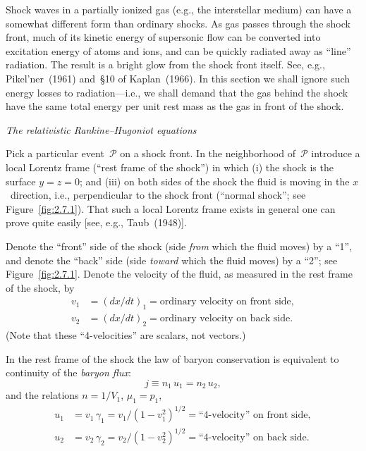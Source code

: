 Shock waves in a partially ionized gas (e.g., the interstellar medium) can have
a somewhat different form than ordinary shocks.  As gas passes through the shock
front, much of its kinetic energy of supersonic flow can be converted into
excitation energy of atoms and ions, and can be quickly radiated away as ``line''
radiation.  The result is a bright glow from the shock front itself.  See, e.g.,
Pikel'ner~(1961) and~\S10 of Kaplan~(1966).  In this section we shall ignore such
energy losses to radiation---i.e., we shall demand that the gas behind the shock
have the same total energy per unit rest mass as the gas in front of the shock.


\bigskip
\noindent
\emph{The relativistic Rankine--Hugoniot equations}

\medskip
\noindent
Pick a particular event~$\mathscr{P}$ on a shock front.  In the neighborhood
of~$\mathscr{P}$ introduce a local Lorentz frame (``rest frame of the shock'')
in which (i) the shock is the surface $y = z = 0$; and (iii) on both sides of
the shock the fluid is moving in the $x$~direction, i.e., perpendicular to the
shock front (``normal shock''; see Figure~\ref{fig:2.7.1}).  That such a local
Lorentz frame exists in general one can prove quite easily [see, e.g.,
Taub~(1948)].

Denote the ``front'' side of the shock (side \emph{from} which the fluid moves)
by a ``1'', and denote the ``back'' side (side \emph{toward} which the fluid
moves) by a ``2''; see Figure~\ref{fig:2.7.1}.  Denote the velocity of the
fluid, as measured in the rest frame of the shock, by
%
\begin{subequations}
\begin{align}
\tag{2.7.1a}
v_1 &= (dx/dt)_1 = \text{ordinary velocity on front side},\\[4pt]
\tag{2.7.1b}
v_2 &= (dx/dt)_2 = \text{ordinary velocity on back side}.
\end{align}
\end{subequations}
%
(Note that these ``4-velocities'' are scalars, not vectors.)

In the rest frame of the shock the law of baryon conservation is equivalent
to continuity of the \emph{baryon flux}:
%
\begin{equation}
\tag{2.7.2a}
j \equiv n_1\,u_1 = n_2\,u_2,
\end{equation}
%
and the relations $n = 1/V_1$, $\mu_1 = p_1$,
%
\begin{subequations}
\begin{align}
\tag{2.7.1c}
u_1 &= v_1\,\gamma_1 = v_1/(1 - v_1^2)^{1/2}
  = \text{``4-velocity'' on front side},\\[4pt]
\tag{2.7.1d}
u_2 &= v_2\,\gamma_2 = v_2/(1 - v_2^2)^{1/2}
  = \text{``4-velocity'' on back side}.
\end{align}
\end{subequations}

